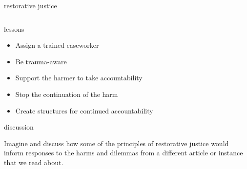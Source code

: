\documentclass[aspectratio=43,17pt]{beamer} %
\begin{document}
\begin{frame}{restorative justice}
\begin{columns}
\begin{column}{0.7\textwidth}

    \end{column}
    \end{columns}


\end{frame}


\begin{frame}{lessons}
    
\begin{itemize}
    \item Assign a trained caseworker
    \item Be trauma-aware
    \item Support the harmer to take accountability
    \item Stop the continuation of the harm
    \item Create structures for continued accountability
\end{itemize}

\end{frame}


\begin{frame}{discussion}
    
Imagine and discuss how some of the principles of \alert{restorative justice} would inform responses to the harms and dilemmas from a different article or instance that we read about.

\end{frame}
\end{document}
